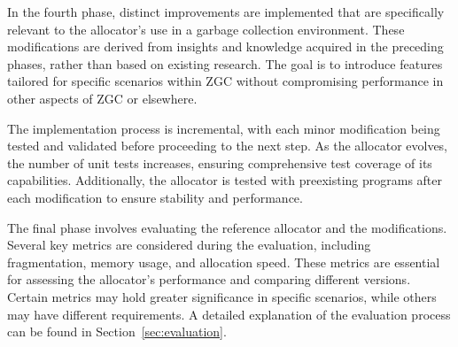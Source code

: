 In the fourth phase, distinct improvements are implemented that are specifically relevant to the allocator's use in a garbage collection environment. These modifications are derived from insights and knowledge acquired in the preceding phases, rather than based on existing research. The goal is to introduce features tailored for specific scenarios within ZGC without compromising performance in other aspects of ZGC or elsewhere.

The implementation process is incremental, with each minor modification being tested and validated before proceeding to the next step. As the allocator evolves, the number of unit tests increases, ensuring comprehensive test coverage of its capabilities. Additionally, the allocator is tested with preexisting programs after each modification to ensure stability and performance.

The final phase involves evaluating the reference allocator and the modifications. Several key metrics are considered during the evaluation, including fragmentation, memory usage, and allocation speed. These metrics are essential for assessing the allocator's performance and comparing different versions. Certain metrics may hold greater significance in specific scenarios, while others may have different requirements. A detailed explanation of the evaluation process can be found in Section~\ref{sec:evaluation}.

